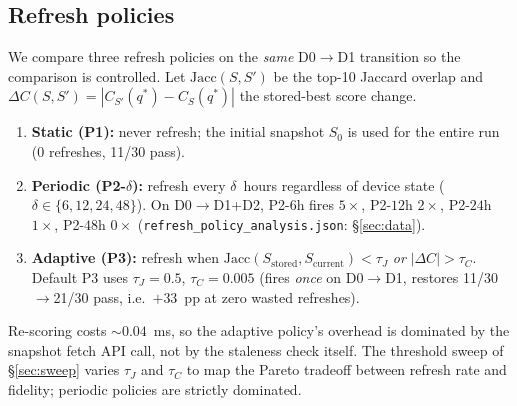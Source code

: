 \documentclass[journal,10pt,twocolumn]{IEEEtran}
\begin{document}
\subsection{Refresh policies}
\label{sec:policies}
We compare three refresh policies on the \emph{same} D0$\to$D1 transition so the comparison is controlled.
Let $\mathrm{Jacc}(S, S')$ be the top-10 Jaccard overlap and $\Delta C(S, S') = |C_{S'}(q^*)-C_S(q^*)|$ the stored-best
score change.
\begin{enumerate}[leftmargin=1.6em,itemsep=1pt,topsep=2pt]
\item \textbf{Static (P1):} never refresh; the initial snapshot $S_0$ is used for the entire run (0 refreshes,
11/30 pass).
\item \textbf{Periodic (P2-$\delta$):} refresh every $\delta$~hours regardless of device state
($\delta \in \{6, 12, 24, 48\}$). On D0$\to$D1+D2, P2-$6$h fires $5\times$, P2-$12$h $2\times$, P2-$24$h $1\times$,
P2-$48$h $0\times$ (\texttt{refresh\_policy\_analysis.json}: \S\ref{sec:data}).
\item \textbf{Adaptive (P3):} refresh when $\mathrm{Jacc}(S_{\mathrm{stored}}, S_{\mathrm{current}}) < \tau_J$
\emph{or} $|\Delta C| > \tau_C$. Default P3 uses $\tau_J{=}0.5$, $\tau_C{=}0.005$ (fires \emph{once} on D0$\to$D1,
restores 11/30$\to$21/30 pass, i.e.\ $+33$~pp at zero wasted refreshes).
\end{enumerate}
Re-scoring costs $\sim0.04$~ms, so the adaptive policy's overhead is dominated by the snapshot fetch API call,
not by the staleness check itself. The threshold sweep of \S\ref{sec:sweep} varies $\tau_J$ and $\tau_C$ to map
the Pareto tradeoff between refresh rate and fidelity; periodic policies are strictly dominated.
\end{document}
